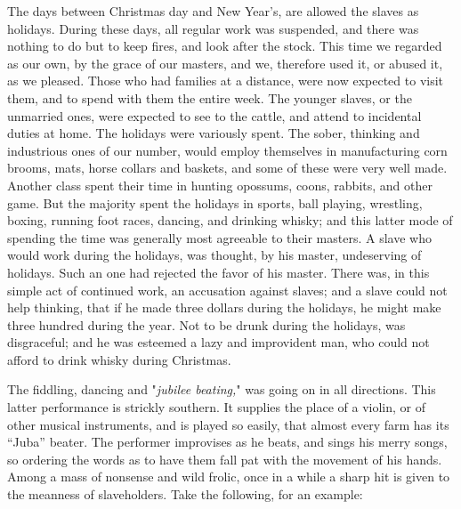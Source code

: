 The days between Christmas day and New Year's, are allowed the slaves as
holidays. During these days, all regular work was suspended, and there
was nothing to do but to keep fires, and look after the stock. This time
we regarded as our own, by the grace of our masters, and we, therefore
used it, or abused it, as we pleased. Those who had families at a
distance, were now expected to visit them, and to spend with them the
entire week. The younger slaves, or the unmarried ones, were expected to
see to the cattle, and attend to incidental duties at home. The holidays
were variously spent. The sober, thinking and industrious ones of our
number, would employ themselves in manufacturing corn brooms, mats,
horse collars and baskets, and some of these were very well made.
Another class spent their time in hunting
{\protect\hypertarget{252}{}{}}opossums, coons, rabbits, and other game.
But the majority spent the holidays in sports, ball playing, wrestling,
boxing, running foot races, dancing, and drinking whisky; and this
latter mode of spending the time was generally most agreeable to their
masters. A slave who would work during the holidays, was thought, by his
master, undeserving of holidays. Such an one had rejected the favor of
his master. There was, in this simple act of continued work, an
accusation against slaves; and a slave could not help thinking, that if
he made three dollars during the holidays, he might make three hundred
during the year. Not to be drunk during the holidays, was disgraceful;
and he was esteemed a lazy and improvident man, who could not afford to
drink whisky during Christmas.

The fiddling, dancing and "\emph{jubilee beating,}" was going on in all
directions. This latter performance is strickly southern. It supplies
the place of a violin, or of other musical instruments, and is played so
easily, that almost every farm has its ``Juba'' beater. The performer
improvises as he beats, and sings his merry songs, so ordering the words
as to have them fall pat with the movement of his hands. Among a mass of
nonsense and wild frolic, once in a while a sharp hit is given to the
meanness of slaveholders. Take the following, for an example:

